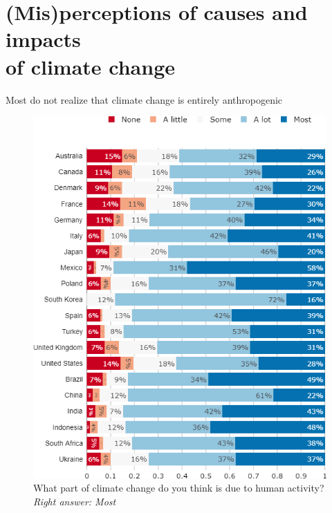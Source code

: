 	
\section{(Mis)perceptions of causes and impacts \\of climate change}

\begin{frame}{Most do not realize that climate change is entirely anthropogenic}%
	\begin{figure}%
	\centering
	\caption{What part of climate change do you think is due to human activity? \footnotesize{\textit{Right answer: Most}}}
	\includegraphics[height=.8\paperheight]{../figures/country_comparison/CC_anthropogenic_countries.png} 
	\end{figure}
\end{frame}

